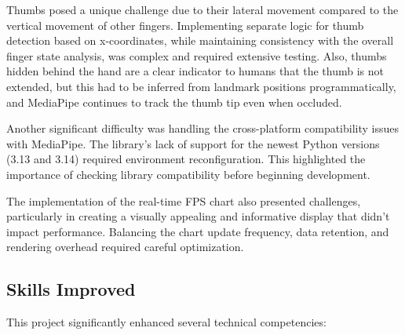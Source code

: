 \documentclass{article}
\begin{document}
Thumbs posed a unique challenge due to their lateral movement compared to the vertical movement of other fingers. Implementing separate logic for thumb detection based on x-coordinates, while maintaining consistency with the overall finger state analysis, was complex and required extensive testing. Also, thumbs hidden behind the hand are a clear indicator to humans that the thumb is not extended, but this had to be inferred from landmark positions programmatically, and MediaPipe continues to track the thumb tip even when occluded.

Another significant difficulty was handling the cross-platform compatibility issues with MediaPipe. The library's lack of support for the newest Python versions (3.13 and 3.14) required environment reconfiguration. This highlighted the importance of checking library compatibility before beginning development.

The implementation of the real-time FPS chart also presented challenges, particularly in creating a visually appealing and informative display that didn't impact performance. Balancing the chart update frequency, data retention, and rendering overhead required careful optimization.

\subsection{Skills Improved}

This project significantly enhanced several technical competencies:
\end{document}

